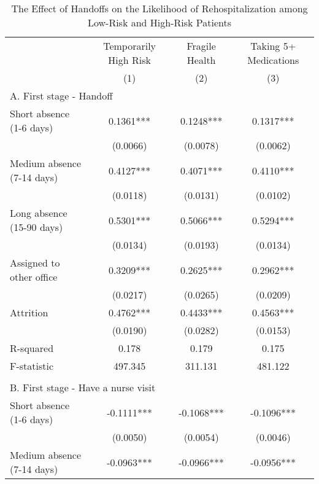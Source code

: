 \documentclass[final,12pt, notitlepage]{article}
\begin{document}
\begin{singlespace}
\begin{table}[H]
\footnotesize
\setlength\tabcolsep{0pt}
\centering
\caption{The Effect of Handoffs on the Likelihood of Rehospitalization among Low-Risk and High-Risk Patients}
\label{tab:iv_byseverity}
\begin{threeparttable}
{
\def\sym#1{\ifmmode^{#1}\else\(^{#1}\)\fi}
\begin{tabular*}{\textwidth}{l@{\extracolsep{\fill}}*{3}{c}}
\toprule
& {Temporarily High Risk} & {Fragile Health} & {Taking 5+ Medications}\\
                    &\multicolumn{1}{c}{(1)}&\multicolumn{1}{c}{(2)}&\multicolumn{1}{c}{(3)}\\
\midrule
\multicolumn{4}{l}{A. First stage - Handoff} \\
Short absence (1-6 days) &      0.1361*** &      0.1248*** &      0.1317***\\
                    &    (0.0066)      &    (0.0078)      &    (0.0062)   \\
Medium absence (7-14 days)&      0.4127*** &      0.4071*** &      0.4110***\\
                     &    (0.0118)       &    (0.0131)    &    (0.0102)   \\
Long absence (15-90 days)&      0.5301*** &      0.5066*** &      0.5294***\\
                   &    (0.0134)      &    (0.0193)     &    (0.0134)   \\
Assigned to other office&      0.3209*** &      0.2625*** &      0.2962***\\
                  &    (0.0217)       &    (0.0265)    &    (0.0209)   \\
Attrition       &      0.4762***  &      0.4433***  &      0.4563***\\
                 &    (0.0190)        &    (0.0282)     &    (0.0153)   \\
R-squared        &       0.178       &       0.179    &       0.175   \\
F-statistic       &     497.345     &     311.131     &     481.122   \\
\\
\multicolumn{4}{l}{B. First stage - Have a nurse visit} \\
Short absence (1-6 days) &     -0.1111*** &     -0.1068*** &     -0.1096***\\
                  &    (0.0050)      &    (0.0054)      &    (0.0046)   \\
Medium absence (7-14 days)&     -0.0963*** &     -0.0966*** &     -0.0956***\\

\end{tabular*}}
\end{threeparttable}
\end{table}
\end{singlespace}
\end{document}

